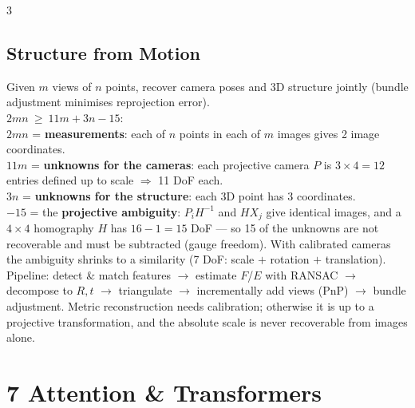 \documentclass[9pt,a4paper,landscape]{extarticle}
\newcommand{\key}[1]{\textbf{#1}}
\begin{document}
\begin{multicols}{3}
\subsection{Structure from Motion}
Given $m$ views of $n$ points, recover camera poses and 3D structure jointly (bundle adjustment minimises reprojection error).\\
\key{$2mn\ \ge\ 11m+3n-15$}:\\
$2mn$ = \key{measurements}: each of $n$ points in each of $m$ images gives 2 image coordinates.\\
$11m$ = \key{unknowns for the cameras}: each projective camera $P$ is $3\times4=12$ entries defined up to scale $\Rightarrow$ 11 DoF each.\\
$3n$ = \key{unknowns for the structure}: each 3D point has 3 coordinates.\\
$-15$ = the \key{projective ambiguity}: $P_iH^{-1}$ and $HX_j$ give identical images, and a $4\times4$ homography $H$ has $16-1=15$ DoF --- so 15 of the unknowns are not recoverable and must be subtracted (gauge freedom). With calibrated cameras the ambiguity shrinks to a similarity (7 DoF: scale $+$ rotation $+$ translation).\\
Pipeline: detect \& match features $\to$ estimate $F$/$E$ with RANSAC $\to$ decompose to $R,t$ $\to$ triangulate $\to$ incrementally add views (PnP) $\to$ bundle adjustment. Metric reconstruction needs calibration; otherwise it is up to a projective transformation, and the absolute scale is never recoverable from images alone.

\section{7 \; Attention \& Transformers}

\end{multicols}
\end{document}
